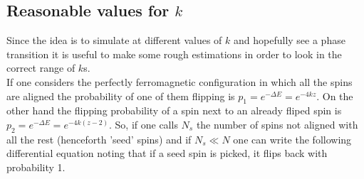 \documentclass[a4paper, 11pt]{article}
\begin{document}


    \subsection{Reasonable values for $k$}
      Since the idea is to simulate at different values of $k$ and hopefully see a phase transition it is useful to make some rough estimations in order to look in the correct range of $k$s.\\
      If one considers the perfectly ferromagnetic configuration in which all the spins are aligned the probability of one of them flipping is $p_1 = e^{-\Delta E} = e^{-4kz}$.
      On the other hand the flipping probability of a spin next to an already fliped spin is $p_2 = e^{-\Delta E} = e^{-4k(z-2)}$.
      So, if one calls $N_{s}$ the number of spins not aligned with all the rest (henceforth 'seed' spins) and if $N_{s} \ll N$ one can write the following differential equation noting that if a seed spin is picked, it flips back with probability 1.
\end{document}
